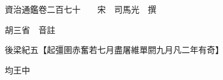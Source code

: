 










 


 
 


 

  
  
  
  
  





  
  
  
  
  
 
  

  

  
  
  



  

 
 

  
   




  

  
  


  　　資治通鑑卷二百七十　　宋　司馬光　撰

　　胡三省　音註

　　後梁紀五【起彊圉赤奮若七月盡屠維單閼九月凡二年有奇】

　　均王中

